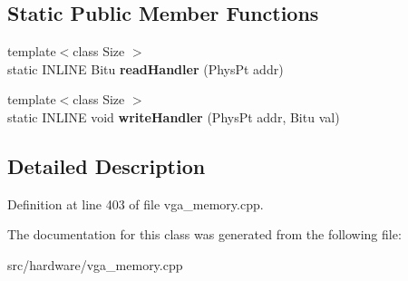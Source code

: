 \subsection*{Static Public Member Functions}
\begin{DoxyCompactItemize}
\item 
\hypertarget{classVGA__ChainedVGA__Handler_aeae9093a9e4de1d76548ca5571a99379}{{\footnotesize template$<$class Size $>$ }\\static I\-N\-L\-I\-N\-E Bitu {\bfseries read\-Handler} (Phys\-Pt addr)}\label{classVGA__ChainedVGA__Handler_aeae9093a9e4de1d76548ca5571a99379}

\item 
\hypertarget{classVGA__ChainedVGA__Handler_a70b3b855fcf2df8aeaf6fa2d0790ac71}{{\footnotesize template$<$class Size $>$ }\\static I\-N\-L\-I\-N\-E void {\bfseries write\-Handler} (Phys\-Pt addr, Bitu val)}\label{classVGA__ChainedVGA__Handler_a70b3b855fcf2df8aeaf6fa2d0790ac71}

\end{DoxyCompactItemize}


\subsection{Detailed Description}


Definition at line 403 of file vga\-\_\-memory.\-cpp.



The documentation for this class was generated from the following file\-:\begin{DoxyCompactItemize}
\item 
src/hardware/vga\-\_\-memory.\-cpp\end{DoxyCompactItemize}
